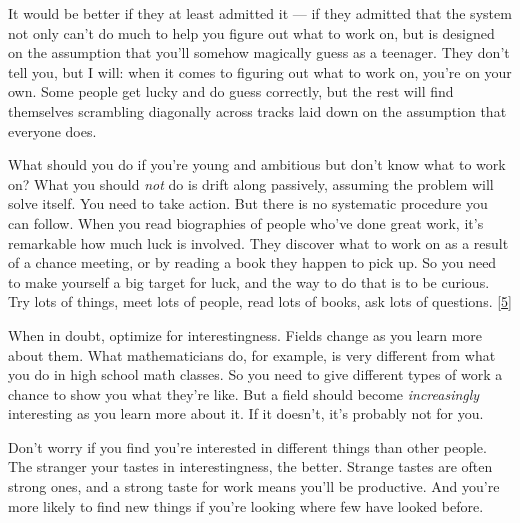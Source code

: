 It would be better if they at
                  least admitted it --- if they admitted that the system not
                  only can't do much to help you figure out what to work on, but
                  is designed on the assumption that you'll somehow magically
                  guess as a teenager. They don't tell you, but I will: when it
                  comes to figuring out what to work on, you're on your own.
                  Some people get lucky and do guess correctly, but the rest
                  will find themselves scrambling diagonally across tracks laid
                  down on the assumption that everyone does.

What
                  should you do if you're young and ambitious but don't know
                  what to work on? What you should \emph{not} do is drift along
                  passively, assuming the problem will solve itself. You need to
                  take action. But there is no systematic procedure you can
                  follow. When you read biographies of people who've done great
                  work, it's remarkable how much luck is involved. They discover
                  what to work on as a result of a chance meeting, or by reading
                  a book they happen to pick up. So you need to make yourself a
                  big target for luck, and the way to do that is to be curious.
                  Try lots of things, meet lots of people, read lots of books,
                  ask lots of questions.
                  [\href{\#f5n}{5}]

When in doubt, optimize for interestingness.
                  Fields change as you learn more about them. What
                  mathematicians do, for example, is very different from what
                  you do in high school math classes. So you need to give
                  different types of work a chance to show you what they're
                  like. But a field should become
                  \emph{increasingly} interesting as you learn more about it. If
                  it doesn't, it's probably not for you.

Don't worry
                  if you find you're interested in different things than other
                  people. The stranger your tastes in interestingness, the
                  better. Strange tastes are often strong ones, and a strong
                  taste for work means you'll be productive. And you're more
                  likely to find new things if you're looking where few have
                  looked before.

